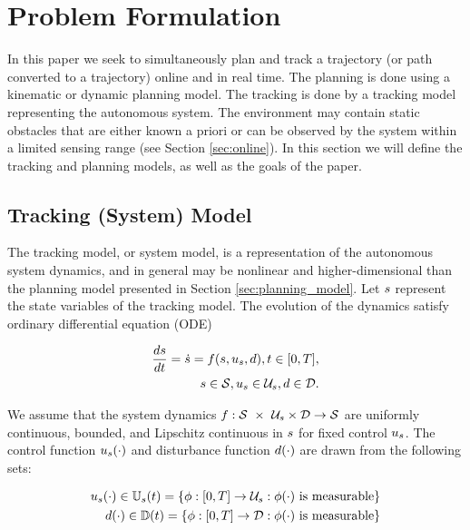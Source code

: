 \section{Problem Formulation \label{sec:formulation}}
In this paper we seek to simultaneously plan and track a trajectory (or path converted to a trajectory) online and in real time. The planning is done using a kinematic or dynamic planning model. The tracking is done by a tracking model representing the autonomous system. The environment may contain static obstacles that are either known a priori or can be observed by the system within a limited sensing range (see Section \ref{sec:online}). In this section we will define the tracking and planning models, as well as the goals of the paper.

\subsection{Tracking (System) Model}
The tracking model, or system model, is a representation of the autonomous system dynamics, and in general may be nonlinear and higher-dimensional than the planning model presented in Section \ref{sec:planning_model}. 
Let $s$ represent the state variables of the tracking model. 
The evolution of the dynamics satisfy ordinary differential equation (ODE)

\begin{equation}
\begin{aligned}
\label{eq:tdyn}
\frac{d\tstate}{d\tvar} = \dot{\tstate} = \tdyn(\tstate, \tctrl, \dstb), \tvar \in [0, \thor], \\
\tstate \in \tset, \tctrl \in \tcset, \dstb \in \dset.
\end{aligned}
\end{equation}

We assume that the system dynamics $f : \mathcal{S}\ \times\ \mathcal{U}_s \times \mathcal{D} \rightarrow \mathcal{S}$ are uniformly continuous, bounded, and Lipschitz continuous in $s$ for fixed control $u_s$. The control function $u_s(\cdot)$ and disturbance function $d(\cdot)$ are drawn from the following sets:

\begin{equation}
\begin{aligned}
u_s(\cdot) \in \mathbb{U}_s(t) = \{\phi: [0, T] \rightarrow \mathcal{U}_s: \phi(\cdot) \text{ is measurable}\}\\
d(\cdot) \in \mathbb{D}(t) = \{\phi: [0, T] \rightarrow \mathcal{D}: \phi(\cdot) \text{ is measurable}\}
\end{aligned}
\end{equation}

